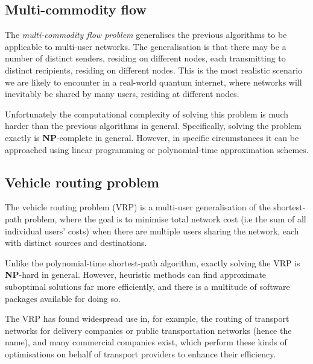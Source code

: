 %
%

\subsection{Multi-commodity flow} \label{sec:multi_comm_flow} 

The \textit{multi-commodity flow problem} \cite{???} generalises the previous algorithms to be applicable to multi-user networks. The generalisation is that there may be a number of distinct senders, residing on different nodes, each transmitting to distinct recipients, residing on different nodes. This is the most realistic scenario we are likely to encounter in a real-world quantum internet, where networks will inevitably be shared by many users, residing at different nodes.

Unfortunately the computational complexity of solving this problem is much harder than the previous algorithms in general. Specifically, solving the problem exactly is \textbf{NP}-complete in general. However, in specific circumstances it can be approached using linear programming or polynomial-time approximation schemes.

%
%

\subsection{Vehicle routing problem} \label{sec:VRP} 

The vehicle routing problem (VRP) is a multi-user generalisation of the shortest-path problem, where the goal is to minimise total network cost (i.e the sum of all individual users' costs) when there are multiple users sharing the network, each with distinct sources and destinations.

Unlike the polynomial-time shortest-path algorithm, exactly solving the VRP is \textbf{NP}-hard in general. However, heuristic methods can find approximate suboptimal solutions far more efficiently, and there is a multitude of software packages available for doing so.

The VRP has found widespread use in, for example, the routing of transport networks for delivery companies or public transportation networks (hence the name), and many commercial companies exist, which perform these kinds of optimisations on behalf of transport providers to enhance their efficiency.


